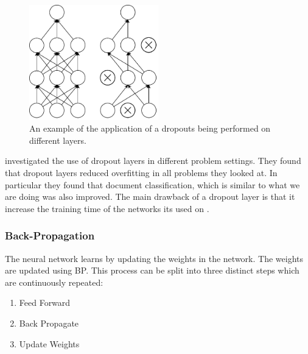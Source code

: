 \begin{description}
        \begin{figure}
            \centering
            \includegraphics[width=0.5\textwidth]{./pictures/method/dropout}
            \caption{An example of the application of a dropouts being performed
                on different layers.}
            \label{fig:dropout}
        \end{figure}

        \citet{JMLR:v15:srivastava14a} investigated the use of dropout
        layers in different problem settings. They found that dropout layers
        reduced overfitting in all problems they looked at. In particular
        they found that document classification, which is similar to what we
        are doing was also improved. The main drawback of a dropout layer
        is that it increase the training time of the networks its used on
        \citep{JMLR:v15:srivastava14a}.

\end{description}


\subsubsection{Back-Propagation}\label{sec:BP}

The neural network learns by updating the weights in the network. The weights
are updated using \gls{BP}. This process can be split into three distinct steps
which are continuously repeated:

\begin{enumerate}
    \item Feed Forward
    \item Back Propagate
    \item Update Weights
\end{enumerate}

